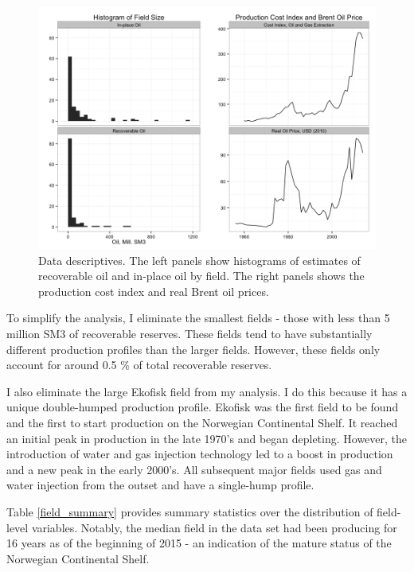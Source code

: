 \documentclass[12pt]{article}
\begin{document}
\begin{figure}
	\includegraphics[width=1\textwidth]{figures/data_descriptives.png}
	\caption{Data descriptives. The left panels show histograms of estimates of recoverable oil and in-place oil by field. The right panels shows the production cost index and real Brent oil prices.}
	\label{data_descriptives}
\end{figure}

To simplify the analysis, I eliminate the smallest fields - those with less than 5 million SM3 of recoverable reserves.  These fields tend to have substantially different production profiles than the larger fields. However, these fields only account for around 0.5 \% of total recoverable reserves. 

I also eliminate the large Ekofisk field from my analysis.  I do this because it has a unique double-humped production profile. Ekofisk was the first field to be found and the first to start production on the Norwegian Continental Shelf. It reached an initial peak in production in the late 1970's and began depleting. However, the introduction of water and gas injection technology led to a boost in production and a new peak in the early 2000's. All subsequent major fields used gas and water injection from the outset and have a single-hump profile. 

Table \ref{field_summary} provides summary statistics over the distribution of field-level variables. Notably, the median field in the data set had been producing for 16 years as of the beginning of 2015 - an indication of the mature status of the Norwegian Continental Shelf. 
\end{document}
